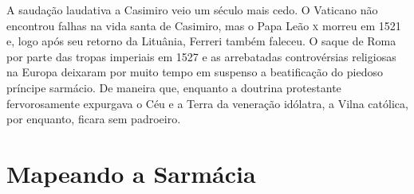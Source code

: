 A saudação laudativa a Casimiro veio um século mais cedo. O Vaticano não
encontrou falhas na vida santa de Casimiro, mas o Papa Leão \textsc{x} morreu em
1521 e, logo após seu retorno da Lituânia, Ferreri também faleceu. O
saque de Roma por parte das tropas imperiais em 1527 e as arrebatadas
controvérsias religiosas na Europa deixaram por muito tempo em suspenso
a beatificação do piedoso príncipe sarmácio. De maneira que, enquanto a
doutrina protestante fervorosamente expurgava o Céu e a Terra da
veneração idólatra, a Vilna católica, por enquanto, ficara sem
padroeiro.

\chapter{Mapeando a Sarmácia}

\begin{epigraphs} 
\end{epigraphs}

